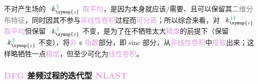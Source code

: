 不对产生场的 $\xint{\begin{smallmatrix} ~ \\ {}^{}_{\mathcolor{gray}{-}} \\ ~ \end{smallmatrix}}{15}{k}_{\symup{z}}^{\;\! \textcolor{PineGreen}{\hat{3}} }$ \textcolor{Plum}{取平均}，是因为本身就应该/需要、且可以保留其\textcolor{gray}{二维分布特征}，同时因其不参与\textcolor{Plum}{非线性卷积}过程而\textcolor{Plum}{可分离}；所以综合来看，对 $\xint{\begin{smallmatrix} ~ \\ {}^{}_{\mathcolor{gray}{-}} \\ ~ \end{smallmatrix}}{15}{k}_{\symup{z}}^{\;\! \textcolor{PineGreen}{\hat{1} \hat{2}} }$ \textcolor{Plum}{取平均}但保留 $\xint{\begin{smallmatrix} ~ \\ {}^{}_{\mathcolor{gray}{-}} \\ ~ \end{smallmatrix}}{15}{k}_{\symup{z}}^{\;\! \textcolor{PineGreen}{\hat{3}} }$ 不变，是为了在不牺牲太大\textcolor{Plum}{精度}的前提下（保留 $\xint{\begin{smallmatrix} ~ \\ {}^{}_{\mathcolor{gray}{-}} \\ ~ \end{smallmatrix}}{15}{k}_{\symup{z}}^{\;\! \textcolor{PineGreen}{\hat{3}} }$ 不变），将\textcolor{Plum}{非} $\mathbb{e}$ \textcolor{Plum}{指数}部分，即 sinc 部分，从\textcolor{Plum}{非线性卷积}中\textcolor{Plum}{提取}出来；这样略牺牲一点\textcolor{Plum}{精度}，但至少可化为\textcolor{Plum}{线性卷积}。

\subsubsection{\textcolor{Plum}{DFG} 差频过程的迭代型 \textcolor{Plum}{NLAST}}\label{sssec:NLAST_sinc_DFG}

